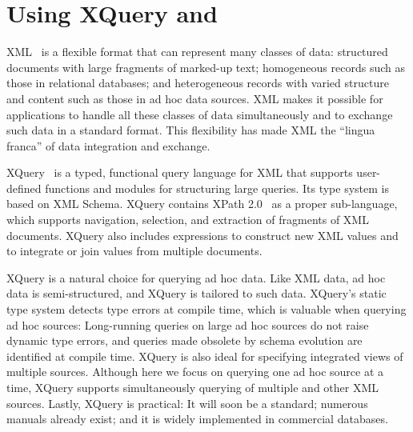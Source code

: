 \section{Using XQuery and \Galax{}}
\label{section:galax}

XML~\cite{xml10} is a flexible format that can represent many classes
of data: structured documents with large fragments of marked-up text;
homogeneous records such as those in relational databases; and
heterogeneous records with varied structure and content such as those
in ad hoc data sources.  XML makes it possible for applications to
handle all these classes of data simultaneously and to exchange such
data in a standard format.  This flexibility has made XML the ``lingua
franca'' of data integration and exchange.

XQuery~\cite{xquery10} is a typed, functional query language for XML
that supports user-defined functions and modules for structuring large
queries.  Its type system is based on XML Schema.  XQuery contains
XPath 2.0~\cite{xpath} as a proper sub-language, which supports
navigation, selection, and extraction of fragments of XML documents.
XQuery also includes expressions to construct new XML values and to
integrate or join values from multiple documents.  

XQuery is a natural choice for querying ad hoc data.  Like XML data,
ad hoc data is semi-structured, and XQuery is tailored to 
such data.  
XQuery's static type system detects type errors at compile time, which
is valuable when querying ad hoc sources: Long-running queries on
large ad hoc sources do not raise dynamic type errors, and queries
made obsolete by schema evolution are identified at compile time.
XQuery is also ideal for specifying integrated views of multiple
sources.  Although here we focus on querying one ad hoc source at a
time, XQuery supports simultaneously querying of multiple \pads{} and
other XML sources. Lastly, XQuery is practical: It will soon be a
standard; numerous manuals already exist; and it is widely implemented
in commercial databases.

